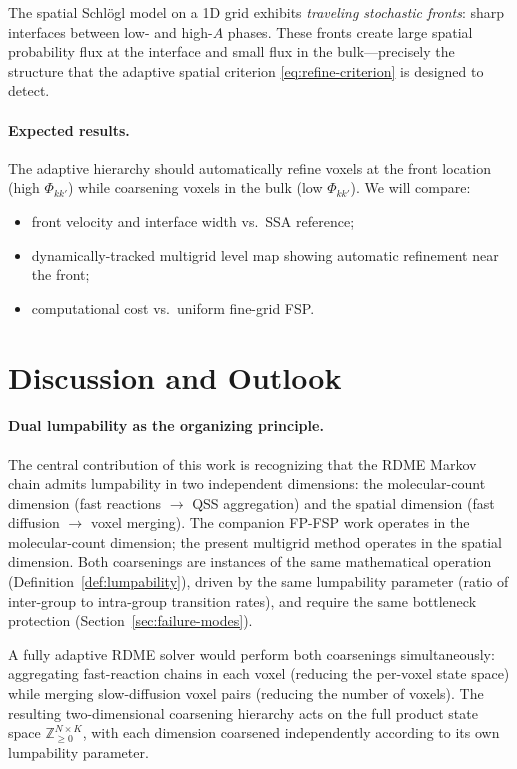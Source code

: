 \documentclass[review,onefignum,onetabnum]{siamart171218}
\newcommand{\Znn}{\mathbb{Z}_{\geq 0}}
\begin{document}
The spatial Schlögl model on a 1D grid exhibits \emph{traveling
stochastic fronts}: sharp interfaces between low- and high-$A$
phases.  These fronts create large spatial probability flux at
the interface and small flux in the bulk---precisely the
structure that the adaptive spatial criterion
\eqref{eq:refine-criterion} is designed to detect.

\paragraph{Expected results.}
The adaptive hierarchy should automatically refine voxels at the
front location (high $\Phi_{kk'}$) while coarsening voxels in the
bulk (low $\Phi_{kk'}$).  We will compare:
\begin{itemize}
  \item front velocity and interface width vs.\ SSA reference;
  \item dynamically-tracked multigrid level map showing automatic
    refinement near the front;
  \item computational cost vs.\ uniform fine-grid FSP.
\end{itemize}

\section{Discussion and Outlook}
\label{sec:discussion}

\paragraph{Dual lumpability as the organizing principle.}
The central contribution of this work is recognizing that the RDME
Markov chain admits lumpability in two independent dimensions:
the molecular-count dimension (fast reactions $\to$ QSS
aggregation) and the spatial dimension (fast diffusion $\to$
voxel merging).  The companion FP-FSP work \cite{Dhumuntarao2024}
operates in the molecular-count dimension; the present multigrid
method operates in the spatial dimension.  Both coarsenings are
instances of the same mathematical operation
(Definition~\ref{def:lumpability}), driven by the same
lumpability parameter (ratio of inter-group to intra-group
transition rates), and require the same bottleneck protection
(Section~\ref{sec:failure-modes}).

A fully adaptive RDME solver would perform both coarsenings
simultaneously: aggregating fast-reaction chains in each voxel
(reducing the per-voxel state space) while merging slow-diffusion
voxel pairs (reducing the number of voxels).  The resulting
two-dimensional coarsening hierarchy acts on the full product
state space $\Znn^{N \times K}$, with each dimension coarsened
independently according to its own lumpability parameter.
\end{document}

